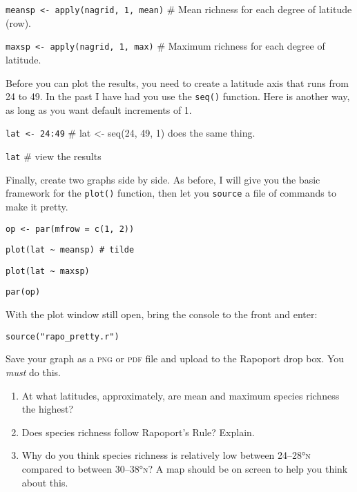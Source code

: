 \documentclass[11pt]{article}
\begin{document}
\texttt{meansp \textless{}- apply(nagrid, 1, mean)} \quad \# Mean 
richness for each degree of latitude (row).

\texttt{maxsp \textless{}- apply(nagrid, 1, max)} \qquad \# Maximum 
richness for each degree of latitude.

Before you can plot the results, you need to create a latitude axis 
that runs from 24 to 49. In the past I have had you use the 
\texttt{seq()} function. Here is another way, as long as you want 
default increments of 1.

\texttt{lat \textless{}- 24:49}  \qquad \# lat \textless{}- 
seq(24, 49, 1) does the same thing.

\texttt{lat} \qquad \# view the results

Finally, create two graphs side by side.
As before, I will give you the basic framework for the \texttt{plot()} 
function, then let you \texttt{source} a file of commands to make it 
pretty.

\texttt{op \textless{}- par(mfrow = c(1, 2))} 

\texttt{plot(lat~\textasciitilde{}~meansp) \quad \# tilde}  

\texttt{plot(lat~\textasciitilde{}~maxsp)}

\texttt{par(op)}

With the plot window still open, bring the console to the front and 
enter:

\texttt{source("rapo\_pretty.r")}

Save your graph as a \textsc{png} or \textsc{pdf} file and upload to 
the Rapoport drop box. You \emph{must} do this.

\begin{enumerate}
	\item At what latitudes, approximately, are mean and maximum 
	species richness the highest? 

	\vspace{5\baselineskip}

	\item Does species richness follow Rapoport's Rule? Explain.

	
	\newpage

	\item Why do you think species richness is relatively low between
	24–28°\textsc{n} compared to between 30–38°\textsc{n}? A map should be on screen to 
	help you think about this.

	\vspace{7\baselineskip}

\end{enumerate}
\end{document}
